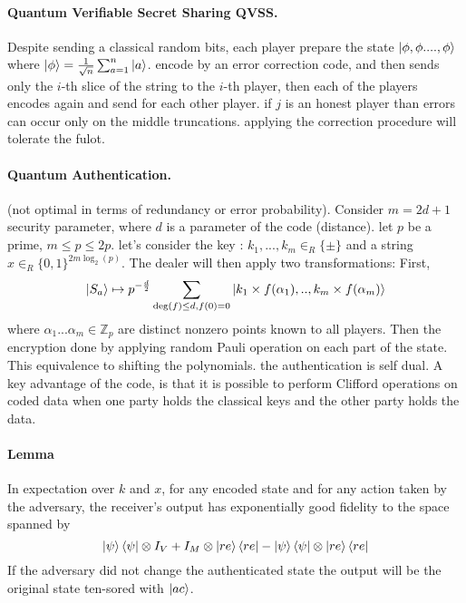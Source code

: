 \paragraph{Quantum Verifiable
Secret Sharing QVSS.} \cite{CGS02} Despite sending a classical random bits, each player prepare the state \( \ket{\phi, \phi .... , \phi} \) where \( \ket{\phi} = \frac{1}{\sqrt{n}}\sum_{a=1}^{n}{\ket{a}} \). encode by an error correction code, and then sends only the \(i\)-th slice of the string to the \(i\)-th player, then each of the players encodes again and send for each other player. if \(j\) is an honest player than errors can occur only on the middle truncations. applying the correction procedure will tolerate the fulot.

\paragraph{Quantum Authentication.} \cite{SecBenor} (not optimal in terms of redundancy or error probability). Consider \( m = 2d+1\) security parameter, where \(d\) is a parameter of the code (distance). let \(p\) be a prime, \( m \le p \le 2p \). let's consider the key : \(k_1,...,k_m \in_R \{ \pm \} \) and a string \( x \in_R \{ 0,1\}^{2m\log_2(p) } \). The dealer will then apply two transformations: First,    \[ \ket{S_a} \mapsto p^{-\frac{d}{2}} \sum_{\deg(f)\le d, f(0) = 0} { \ket{k_1 \times f(\alpha_1), .. ,k_m\times f(\alpha_m) }} \] where \( \alpha_1... \alpha_m \in \mathbb{Z}_p \) are distinct nonzero points known to all players. Then the encryption done by applying random Pauli operation on each part of the state. This equivalence to shifting the polynomials. the authentication is self dual. A key advantage of the code, is that it is possible to perform Clifford operations on coded data when one party holds the classical keys and the other party holds the data.  \paragraph{Lemma} In expectation over \(k\) and \(x\), for any encoded state and for any action taken by the adversary, the receiver's output has exponentially good fidelity to the space spanned by \[ \ket{\psi}\bra{\psi}\otimes I_V + I_M\otimes\ket{re}\bra{re} - \ket{\psi}\bra{\psi}\otimes\ket{re}\bra{re} \] If the adversary did not change the authenticated state the output will be the original state ten-sored with \( \ket{ac} \).    
